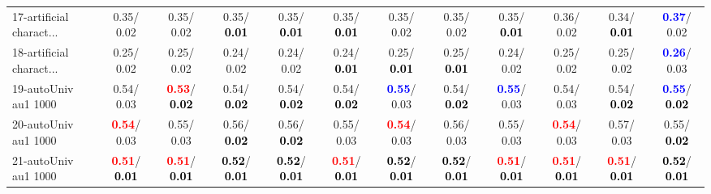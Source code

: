 \begin{table}[h]
\begin{center}
{\begin{tabular}{lc|c|c|c|c|c|c|c|c|c|c}
17-artificial charact... &   0.35/  0.02 &   0.35/  0.02 &   0.35/\textcolor{black}{\textbf{  0.01}} &   0.35/\textcolor{black}{\textbf{  0.01}} &   0.35/\textcolor{black}{\textbf{  0.01}} &   0.35/  0.02 &   0.35/  0.02 &   0.35/\textcolor{black}{\textbf{  0.01}} &   0.36/  0.02 &   0.34/\textcolor{black}{\textbf{  0.01}} & \textcolor{blue}{\textbf{  0.37}}/  0.02 \\
18-artificial charact... &   0.25/  0.02 &   0.25/  0.02 &   0.24/  0.02 &   0.24/  0.02 &   0.24/\textcolor{black}{\textbf{  0.01}} &   0.25/\textcolor{black}{\textbf{  0.01}} &   0.25/\textcolor{black}{\textbf{  0.01}} &   0.24/  0.02 &   0.25/  0.02 &   0.25/  0.02 & \textcolor{blue}{\textbf{  0.26}}/  0.03 \\
19-autoUniv au1 1000 &   0.54/  0.03 & \textcolor{red}{\textbf{  0.53}}/\textcolor{black}{\textbf{  0.02}} &   0.54/\textcolor{black}{\textbf{  0.02}} &   0.54/\textcolor{black}{\textbf{  0.02}} &   0.54/\textcolor{black}{\textbf{  0.02}} & \textcolor{blue}{\textbf{  0.55}}/  0.03 &   0.54/\textcolor{black}{\textbf{  0.02}} & \textcolor{blue}{\textbf{  0.55}}/  0.03 &   0.54/  0.03 &   0.54/\textcolor{black}{\textbf{  0.02}} & \textcolor{blue}{\textbf{  0.55}}/\textcolor{black}{\textbf{  0.02}} \\
20-autoUniv au1 1000 & \textcolor{red}{\textbf{  0.54}}/  0.03 &   0.55/  0.03 &   0.56/\textcolor{black}{\textbf{  0.02}} &   0.56/\textcolor{black}{\textbf{  0.02}} &   0.55/  0.03 & \textcolor{red}{\textbf{  0.54}}/  0.03 &   0.56/  0.03 &   0.55/  0.03 & \textcolor{red}{\textbf{  0.54}}/  0.03 &   0.57/  0.03 &   0.55/\textcolor{black}{\textbf{  0.02}} \\
21-autoUniv au1 1000 & \textcolor{red}{\textbf{  0.51}}/\textcolor{black}{\textbf{  0.01}} & \textcolor{red}{\textbf{  0.51}}/\textcolor{black}{\textbf{  0.01}} & \textcolor{black}{\textbf{  0.52}}/\textcolor{black}{\textbf{  0.01}} & \textcolor{black}{\textbf{  0.52}}/\textcolor{black}{\textbf{  0.01}} & \textcolor{red}{\textbf{  0.51}}/\textcolor{black}{\textbf{  0.01}} & \textcolor{black}{\textbf{  0.52}}/\textcolor{black}{\textbf{  0.01}} & \textcolor{black}{\textbf{  0.52}}/\textcolor{black}{\textbf{  0.01}} & \textcolor{red}{\textbf{  0.51}}/\textcolor{black}{\textbf{  0.01}} & \textcolor{red}{\textbf{  0.51}}/\textcolor{black}{\textbf{  0.01}} & \textcolor{red}{\textbf{  0.51}}/\textcolor{black}{\textbf{  0.01}} & \textcolor{black}{\textbf{  0.52}}/\textcolor{black}{\textbf{  0.01}} \\ \hline

\end{tabular}}
\end{center}
\end{table}
